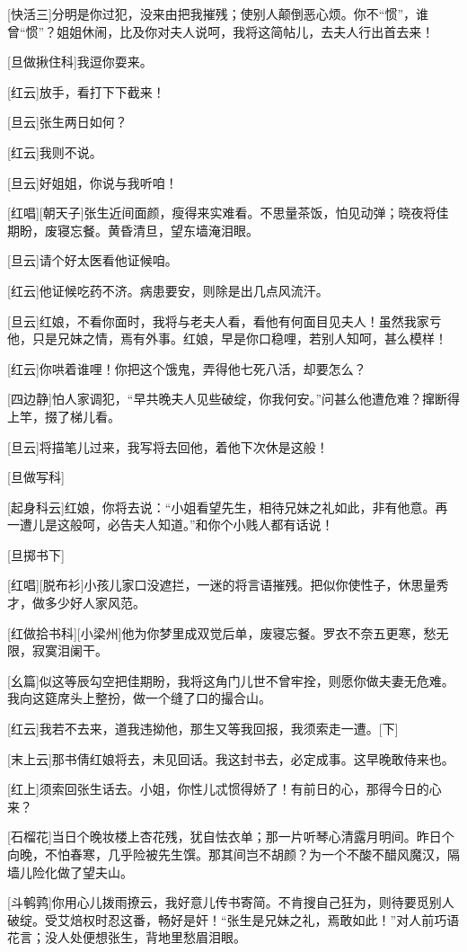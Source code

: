 \documentclass{book}
\begin{document}
[快活三]分明是你过犯，没来由把我摧残；使别人颠倒恶心烦。你不``惯''，谁曾``惯''？姐姐休闹，比及你对夫人说呵，我将这简帖儿，去夫人行出首去来！

[旦做揪住科]我逗你耍来。

[红云]放手，看打下下截来！

[旦云]张生两日如何？

[红云]我则不说。

[旦云]好姐姐，你说与我听咱！

[红唱][朝天子]张生近间面颜，瘦得来实难看。不思量茶饭，怕见动弹；晓夜将佳期盼，废寝忘餐。黄昏清旦，望东墙淹泪眼。

[旦云]请个好太医看他证候咱。

[红云]他证候吃药不济。病患要安，则除是出几点风流汗。

[旦云]红娘，不看你面时，我将与老夫人看，看他有何面目见夫人！虽然我家亏他，只是兄妹之情，焉有外事。红娘，早是你口稳哩，若别人知呵，甚么模样！

[红云]你哄着谁哩！你把这个饿鬼，弄得他七死八活，却要怎么？

[四边静]怕人家调犯，``早共晚夫人见些破绽，你我何安。''问甚么他遭危难？撺断得上竿，掇了梯儿看。

[旦云]将描笔儿过来，我写将去回他，着他下次休是这般！

[旦做写科]

[起身科云]红娘，你将去说：``小姐看望先生，相待兄妹之礼如此，非有他意。再一遭儿是这般呵，必告夫人知道。''和你个小贱人都有话说！

[旦掷书下]

[红唱][脱布衫]小孩儿家口没遮拦，一迷的将言语摧残。把似你使性子，休思量秀才，做多少好人家风范。

[红做拾书科][小梁州]他为你梦里成双觉后单，废寝忘餐。罗衣不奈五更寒，愁无限，寂寞泪阑干。

[幺篇]似这等辰勾空把佳期盼，我将这角门儿世不曾牢拴，则愿你做夫妻无危难。我向这筵席头上整扮，做一个缝了口的撮合山。

[红云]我若不去来，道我违拗他，那生又等我回报，我须索走一遭。[下]

[末上云]那书倩红娘将去，未见回话。我这封书去，必定成事。这早晚敢侍来也。

[红上]须索回张生话去。小姐，你性儿忒惯得娇了！有前日的心，那得今日的心来？

[石榴花]当日个晚妆楼上杏花残，犹自怯衣单；那一片听琴心清露月明间。昨日个向晚，不怕春寒，几乎险被先生馔。那其间岂不胡颜？为一个不酸不醋风魔汉，隔墙儿险化做了望夫山。

[斗鹌鹑]你用心儿拨雨撩云，我好意儿传书寄简。不肯搜自己狂为，则待要觅别人破绽。受艾焙权时忍这番，畅好是奸！``张生是兄妹之礼，焉敢如此！''对人前巧语花言；没人处便想张生，背地里愁眉泪眼。
\end{document}
